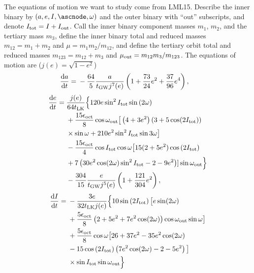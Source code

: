 \documentclass[10pt,
        twocolumn,
        fleqn,
    ]{revtex4-2}%
\newcommand*{\rd}[2]{\frac{\mathrm{d}#1}{\mathrm{d}#2}}
\newcommand*{\p}[1]{\left(#1\right)}
\begin{document}
The equations of motion we want to study come from LML15. Describe the inner
binary by $\p{a, e, I, \ascnode, \omega}$ and the outer binary with ``out''
subscripts, and denote $I_{\rm tot} = I + I_{\rm out}$. Call the inner binary
component masses $m_1$, $m_2$, and the tertiary mass $m_3$, define the inner
binary total and reduced masses $m_{12} = m_1 + m_2$ and $\mu = m_1m_2 /
m_{12}$, and define the tertiary orbit total and reduced masses $m_{123} =
m_{12} + m_3$ and $\mu_{\rm out} = m_{12}m_3 / m_{123}$. The equations of motion
are ($j(e) = \sqrt{1 - e^2}$)
{\small
\begin{align}
    \rd{a}{t} ={}& -\frac{64}{5}\frac{a}{t_{\rm GW}j^7(e)}
            \p{1 + \frac{73}{24}e^2 +
            \frac{37}{96}e^4},
\end{align}
\begin{align}
    \rd{e}{t} ={}& \frac{j(e)}{64t_{\rm LK}}\Big\{
            120 e \sin^2 I_{\rm tot} \sin \p{2\omega}\nonumber\\
        &+ \frac{15 \epsilon_{\rm oct}}{8}\cos \omega_{\rm out}
            \big[\p{4 + 3e^2}\p{3 + 5\cos (2I_{\rm tot})}\nonumber\\
        &\times \sin \omega + 210 e^2\sin^2I_{\rm tot} \sin 3\omega\big]
            \nonumber\\
        &- \frac{15 \epsilon_{\rm oct}}{4} \cos I_{\rm tot} \cos \omega
            \big[15(2 + 5e^2) \cos \p{2I_{\rm tot}}\nonumber\\
        &+ 7\p{30 e^2 \cos(2\omega) \sin^2 I_{\rm tot} - 2 - 9e^2}]
                \sin \omega_{\rm out}\Big\}\nonumber\\
        &- \frac{304}{15}\frac{e}{t_{\rm GW}j^5(e)}
            \p{1 + \frac{121}{304}e^2},
\end{align}
\begin{align}
    \rd{I}{t} ={}& -\frac{3e}{32t_{\rm LK}j(e)}\Big\{
            10\sin\p{2I_{\rm tot}}\big[e \sin (2\omega)\nonumber\\
        &+ \frac{5\epsilon_{\rm oct}}{8}\p{2 + 5e^2 + 7e^2\cos(2\omega)}
            \cos \omega_{\rm out}\sin \omega\big]\nonumber\\
        &+ \frac{5\epsilon_{\rm oct}}{8} \cos \omega \big[
            26 + 37e^2 -35 e^2\cos(2\omega)\nonumber\\
        &- 15\cos\p{2I_{\rm tot}}\p{7e^2\cos (2\omega) - 2 - 5e^2}\big]\nonumber\\
        &\times \sin I_{\rm tot}\sin \omega_{\rm out}\Big\}
\end{align}
\begin{align}

\end{align}}
\end{document}
